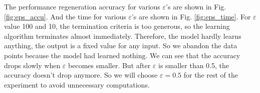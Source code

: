 
%
%
The performance regeneration accuracy for various $\varepsilon$'s are shown in Fig. \ref{fig:eps_accu}. And the time for various $\varepsilon$'s are shown in Fig. \ref{fig:eps_time}. For $\varepsilon$ value 100 and 10, the termination criteria is too generous, so the learning algorithm terminates almost immediately. Therefore, the model hardly learns anything, the output is a fixed value for any input. So we abandon the data points because the model had learned nothing. We can see that the accuracy drops slowly when $\varepsilon$ becomes smaller. But after $\varepsilon$ is smaller than 0.5, the accuracy doesn't drop anymore. So we will choose $\varepsilon = 0.5 $ for the rest of the experiment to avoid unnecessary computations.

